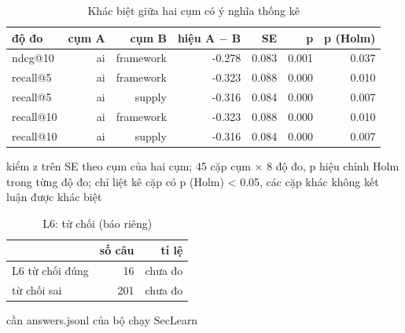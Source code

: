 \begin{table}[ht]
\centering
\caption{Khác biệt giữa hai cụm có ý nghĩa thống kê}
\begin{tabular}{lrrrrrr}
\toprule
độ đo & cụm A & cụm B & hiệu A $-$ B & SE & p & p (Holm) \\
\midrule
ndcg@10 & ai & framework & -0.278 & 0.083 & 0.001 & 0.037 \\
recall@5 & ai & framework & -0.323 & 0.088 & 0.000 & 0.010 \\
recall@5 & ai & supply & -0.316 & 0.084 & 0.000 & 0.007 \\
recall@10 & ai & framework & -0.323 & 0.088 & 0.000 & 0.010 \\
recall@10 & ai & supply & -0.316 & 0.084 & 0.000 & 0.007 \\
\bottomrule
\end{tabular}
\par\smallskip\footnotesize kiểm z trên SE theo cụm của hai cụm; 45 cặp cụm × 8 độ đo, p hiệu chỉnh Holm trong từng độ đo; chỉ liệt kê cặp có p (Holm) < 0.05, các cặp khác không kết luận được khác biệt
\end{table}

\begin{table}[ht]
\centering
\caption{L6: từ chối (báo riêng)}
\begin{tabular}{lrr}
\toprule
 & số câu & tỉ lệ \\
\midrule
L6 từ chối đúng & 16 & chưa đo \\
từ chối sai & 201 & chưa đo \\
\bottomrule
\end{tabular}
\par\smallskip\footnotesize cần answers.jsonl của bộ chạy SecLearn
\end{table}

